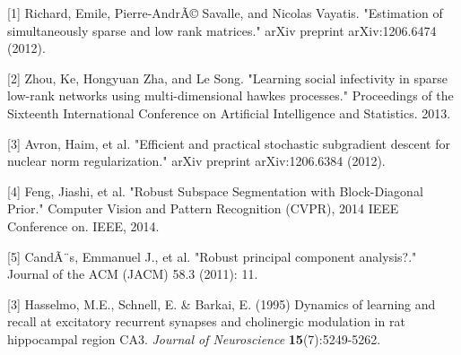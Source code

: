 \documentclass{article} %
\begin{document}
\small{
[1] Richard, Emile, Pierre-AndrÃ© Savalle, and Nicolas Vayatis. "Estimation of simultaneously sparse and low rank matrices." arXiv preprint arXiv:1206.6474 (2012).

[2] Zhou, Ke, Hongyuan Zha, and Le Song. "Learning social infectivity in sparse low-rank networks using multi-dimensional hawkes processes." Proceedings of the Sixteenth International Conference on Artificial Intelligence and Statistics. 2013.

[3] Avron, Haim, et al. "Efficient and practical stochastic subgradient descent for nuclear norm regularization." arXiv preprint arXiv:1206.6384 (2012).

[4] Feng, Jiashi, et al. "Robust Subspace Segmentation with Block-Diagonal Prior." Computer Vision and Pattern Recognition (CVPR), 2014 IEEE Conference on. IEEE, 2014.

[5] CandÃ¨s, Emmanuel J., et al. "Robust principal component analysis?." Journal of the ACM (JACM) 58.3 (2011): 11.

[3] Hasselmo, M.E., Schnell, E. \& Barkai, E. (1995) Dynamics of learning
and recall at excitatory recurrent synapses and cholinergic modulation
in rat hippocampal region CA3. {\it Journal of Neuroscience}
{\bf 15}(7):5249-5262.
}
\end{document}

